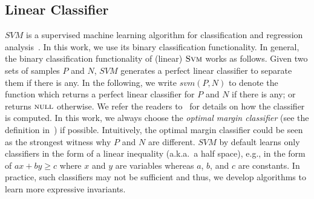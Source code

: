 \subsection{Linear Classifier}
$\mathit{SVM}$ is a supervised machine learning algorithm for classification and regression analysis~\cite{svm:original}. 
In this work, we use its binary classification functionality.
In general, the binary classification functionality of (linear) $\textsc{Svm}$ works as follows.
Given two sets of samples $P$ and $N$, $\mathit{SVM}$ generates a perfect linear classifier to separate them if there is any.
In the following, we write $\mathit{svm}(P, N)$ to denote the function which returns a perfect linear classifier for $P$ and $N$ if there is any; 
or returns $\textsc{null}$ otherwise.
We refer the readers to~\cite{svm:smo} for details on how the classifier is computed.
In this work, we always choose the \textit{optimal margin classifier} (see the definition in~\cite{sharma2012interpolants}) if possible.
Intuitively, the optimal margin classifier could be seen as the strongest witness why $P$ and $N$ are different.
$\mathit{SVM}$ by default learns only classifiers in the form of a linear inequality (a.k.a.~a half space),
e.g., in the form of $\mathit{a x + b y \geq c}$ where $x$ and $y$ are variables whereas $a$, $b$, and $c$ are constants.
In practice, such classifiers may not be sufficient and thus, we develop algorithms to learn more expressive invariants.


